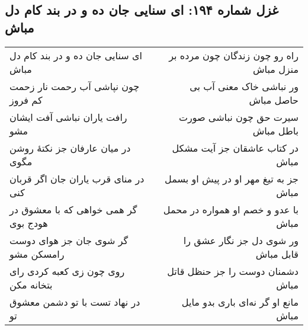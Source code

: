 \begin{center}
\section*{غزل شماره ۱۹۴: ای سنایی جان ده و در بند کام دل مباش}
\label{sec:194}
\begin{longtable}{l p{0.5cm} r}
ای سنایی جان ده و در بند کام دل مباش
&&
راه رو چون زندگان چون مرده بر منزل مباش
\\
چون نپاشی آب رحمت نار زحمت کم فروز
&&
ور نباشی خاک معنی آب بی حاصل مباش
\\
رافت یاران نباشی آفت ایشان مشو
&&
سیرت حق چون نباشی صورت باطل مباش
\\
در میان عارفان جز نکتهٔ روشن مگوی
&&
در کتاب عاشقان جز آیت مشکل مباش
\\
در منای قرب یاران جان اگر قربان کنی
&&
جز به تیغ مهر او در پیش او بسمل مباش
\\
گر همی خواهی که با معشوق در هودج بوی
&&
با عدو و خصم او همواره در محمل مباش
\\
گر شوی جان جز هوای دوست رامسکن مشو
&&
ور شوی دل جز نگار عشق را قابل مباش
\\
روی چون زی کعبه کردی رای بتخانه مکن
&&
دشمنان دوست را جز حنظل قاتل مباش
\\
در نهاد تست با تو دشمن معشوق تو
&&
مانع او گر نه‌ای باری بدو مایل مباش
\\
\end{longtable}
\end{center}
